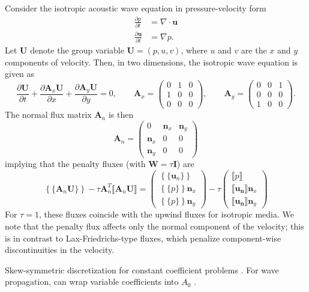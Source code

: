 \documentclass[10pt]{article}
\newcommand{\pd}[2]{\frac{\partial#1}{\partial#2}}
\newcommand{\LRc}[1]{\left\{ #1 \right\}}
\newcommand{\Grad} {\ensuremath{\nabla}}
\newcommand{\Div} {\ensuremath{\nabla\cdot}}
\newcommand{\jump}[1] {\ensuremath{\llbracket#1\rrbracket}}
\newcommand{\avg}[1] {\ensuremath{\LRc{\!\{#1\}\!}}}
\newcommand{\note}[1]{{\color{blue}#1}}
\begin{document}
Consider the isotropic acoustic wave equation in pressure-velocity form
\begin{align*}
\pd{p}{t} &= \Div \bm{u}\\
\pd{\bm{u}}{t} &= \Grad p.
\end{align*}
Let $\bm{U}$ denote the group variable $\bm{U} = (p,u,v)$, where $u$ and $v$ are the $x$ and $y$ components of velocity.  Then, in two dimensions, the isotropic wave equation is given as
\[
\pd{\bm{U}}{t} + \pd{\bm{A}_x\bm{U}}{x} + \pd{\bm{A}_y\bm{U}}{y} = 0, \qquad \bm{A}_x = 
\left(\begin{array}{ccc}
0 & 1 & 0\\
1 & 0 & 0\\
0 & 0 & 0
\end{array}
\right), \qquad 
\bm{A}_y = 
\left(\begin{array}{ccc}
0 & 0 & 1\\
0 & 0 & 0\\
1 & 0 & 0
\end{array}
\right).
\]
The normal flux matrix $\bm{A}_n$ is then
\[
\bm{A}_n = 
\left(\begin{array}{ccc}
0 & \bm{n}_x & \bm{n}_y\\
\bm{n}_x & 0 & 0\\
\bm{n}_y & 0 & 0
\end{array}
\right)
\]
implying that the penalty fluxes (with $\bm{W} = \tau\bm{I}$) are 
\[
\avg{\bm{A}_n \bm{U}} - \tau\bm{A}_n^T \jump{\bm{A}_n\bm{U}} = \left(\begin{array}{c}
\avg{\bm{u}_n}\\
\avg{p }\bm{n}_x\\
\avg{p }\bm{n}_y
\end{array}
\right) - 
\tau\left(\begin{array}{c}
\jump{p}\\
\jump{\bm{u_n}}\bm{n}_x\\
\jump{\bm{u_n}}\bm{n}_y
\end{array}
\right)
\]
For $\tau = 1$, these fluxes coincide with the upwind fluxes for isotropic media.  We note that the penalty flux affects only the normal component of the velocity; this is in contrast to Lax-Friedrichs-type fluxes, which penalize component-wise discontinuities in the velocity.  

\note{Skew-symmetric discretization for constant coefficient problems \cite{kopriva2014energy}.  For wave propagation, can wrap variable coefficients into $A_0$ \cite{chan2016weight1,chan2016weight2}}.  
\end{document}

